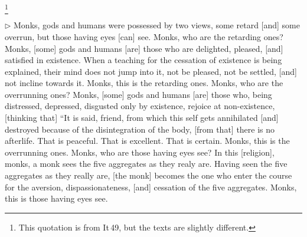 \footnote{This quotation is from It\,49, but the texts are slightly different.}

\addtocounter{sennum}{-4}
$\triangleright$  Monks, gods and humans were possessed by two views, some retard [and] some overrun, but those having eyes [can] see.  Monks, who are the retarding ones? Monks, [some] gods and humans [are] those who are delighted, pleased, [and] satisfied in existence. When a teaching for the cessation of existence is being explained, their mind does not jump into it, not be pleased, not be settled, [and] not incline towards it. Monks, this is the retarding ones.  Monks, who are the overrunning ones? Monks, [some] gods and humans [are] those who, being distressed, depressed, disgusted only by existence, rejoice at non-existence, [thinking that] ``It is said, friend, from which this self gets annihilated [and] destroyed because of the disintegration of the body, [from that] there is no afterlife. That is peaceful. That is excellent. That is certain. Monks, this is the overrunning ones.  Monks, who are those having eyes see? In this [religion], monks, a monk sees the five aggregates as they realy are. Having seen the five aggregates as they really are, [the monk] becomes the one who enter the course for the aversion, dispassionateness, [and] cessation of the five aggregates. Monks, this is those having eyes see.\\

